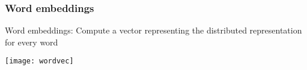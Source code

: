 


\begin{frame}[fragile]\frametitle{Word embeddings}
Word embeddings: Compute a vector representing the distributed representation for every word
\begin{center}
\texttt{[image: wordvec]}
\end{center}
\end{frame}




